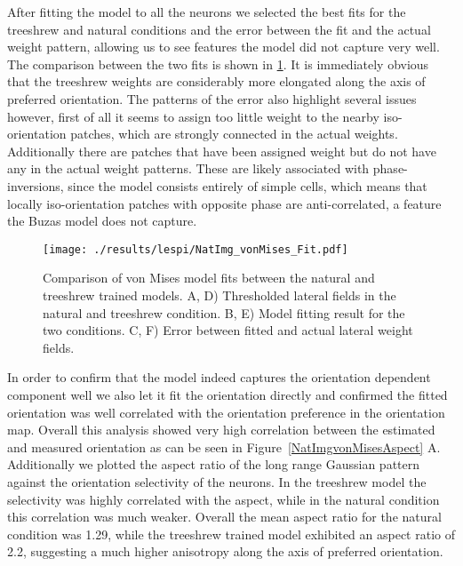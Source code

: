 After fitting the model to all the neurons we selected the best fits
for the treeshrew and natural conditions and the error between the fit
and the actual weight pattern, allowing us to see features the model
did not capture very well. The comparison between the two fits is
shown in \ref{NatImgvonMises}. It is immediately obvious that the
treeshrew weights are considerably more elongated along the axis of
preferred orientation. The patterns of the error also highlight
several issues however, first of all it seems to assign too little
weight to the nearby iso-orientation patches, which are strongly
connected in the actual weights. Additionally there are patches that
have been assigned weight but do not have any in the actual weight
patterns. These are likely associated with phase-inversions, since the
model consists entirely of simple cells, which means that locally
iso-orientation patches with opposite phase are anti-correlated, a
feature the Buzas model does not capture.

\begin{figure}
	\centering
        \texttt{[image: ./results/lespi/NatImg\_vonMises\_Fit.pdf]}
	\caption[Comparison of \cite{Buzas2006} von Mises model fit between
      the natural and treeshrew trained models.]{Comparison of
      \cite{Buzas2006} von Mises model fits between the natural and
      treeshrew trained models. A, D) Thresholded lateral fields in
      the natural and treeshrew condition. B, E) Model fitting result
      for the two conditions. C, F) Error between fitted and actual
      lateral weight fields.}
	\label{NatImgvonMises}
\end{figure}

In order to confirm that the model indeed captures the orientation
dependent component well we also let it fit the orientation directly
and confirmed the fitted orientation was well correlated with the
orientation preference in the orientation map. Overall this analysis
showed very high correlation between the estimated and measured
orientation as can be seen in Figure~\ref{NatImgvonMisesAspect}
A. Additionally we plotted the aspect ratio of the long range Gaussian
pattern against the orientation selectivity of the neurons. In the
treeshrew model the selectivity was highly correlated with the aspect,
while in the natural condition this correlation was much
weaker. Overall the mean aspect ratio for the natural condition was
1.29, while the treeshrew trained model exhibited an aspect ratio of
2.2, suggesting a much higher anisotropy along the axis of preferred
orientation.

